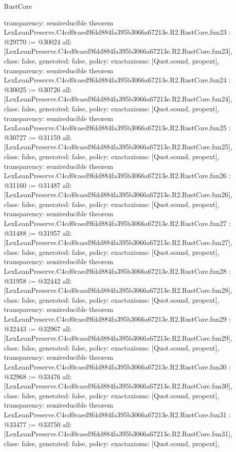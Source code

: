 \begin{lexlean}{RustCore}
\begin{coremodule}
{  transparency: semireducible
}
theorem LexLeanPreserve.C4cd0caed9fdd884fa395b3066a67213e.R2.RustCore.fun23 : @29770 := @30024 {
  all: [LexLeanPreserve.C4cd0caed9fdd884fa395b3066a67213e.R2.RustCore.fun23],
  class: false,
  generated: false,
  policy: exact{axioms: [Quot.sound, propext]},
  transparency: semireducible
}
theorem LexLeanPreserve.C4cd0caed9fdd884fa395b3066a67213e.R2.RustCore.fun24 : @30025 := @30726 {
  all: [LexLeanPreserve.C4cd0caed9fdd884fa395b3066a67213e.R2.RustCore.fun24],
  class: false,
  generated: false,
  policy: exact{axioms: [Quot.sound, propext]},
  transparency: semireducible
}
theorem LexLeanPreserve.C4cd0caed9fdd884fa395b3066a67213e.R2.RustCore.fun25 : @30727 := @31159 {
  all: [LexLeanPreserve.C4cd0caed9fdd884fa395b3066a67213e.R2.RustCore.fun25],
  class: false,
  generated: false,
  policy: exact{axioms: [Quot.sound, propext]},
  transparency: semireducible
}
theorem LexLeanPreserve.C4cd0caed9fdd884fa395b3066a67213e.R2.RustCore.fun26 : @31160 := @31487 {
  all: [LexLeanPreserve.C4cd0caed9fdd884fa395b3066a67213e.R2.RustCore.fun26],
  class: false,
  generated: false,
  policy: exact{axioms: [Quot.sound, propext]},
  transparency: semireducible
}
theorem LexLeanPreserve.C4cd0caed9fdd884fa395b3066a67213e.R2.RustCore.fun27 : @31488 := @31957 {
  all: [LexLeanPreserve.C4cd0caed9fdd884fa395b3066a67213e.R2.RustCore.fun27],
  class: false,
  generated: false,
  policy: exact{axioms: [Quot.sound, propext]},
  transparency: semireducible
}
theorem LexLeanPreserve.C4cd0caed9fdd884fa395b3066a67213e.R2.RustCore.fun28 : @31958 := @32442 {
  all: [LexLeanPreserve.C4cd0caed9fdd884fa395b3066a67213e.R2.RustCore.fun28],
  class: false,
  generated: false,
  policy: exact{axioms: [Quot.sound, propext]},
  transparency: semireducible
}
theorem LexLeanPreserve.C4cd0caed9fdd884fa395b3066a67213e.R2.RustCore.fun29 : @32443 := @32967 {
  all: [LexLeanPreserve.C4cd0caed9fdd884fa395b3066a67213e.R2.RustCore.fun29],
  class: false,
  generated: false,
  policy: exact{axioms: [Quot.sound, propext]},
  transparency: semireducible
}
theorem LexLeanPreserve.C4cd0caed9fdd884fa395b3066a67213e.R2.RustCore.fun30 : @32968 := @33476 {
  all: [LexLeanPreserve.C4cd0caed9fdd884fa395b3066a67213e.R2.RustCore.fun30],
  class: false,
  generated: false,
  policy: exact{axioms: [Quot.sound, propext]},
  transparency: semireducible
}
theorem LexLeanPreserve.C4cd0caed9fdd884fa395b3066a67213e.R2.RustCore.fun31 : @33477 := @33750 {
  all: [LexLeanPreserve.C4cd0caed9fdd884fa395b3066a67213e.R2.RustCore.fun31],
  class: false,
  generated: false,
  policy: exact{axioms: [Quot.sound, propext]},
}
\end{coremodule}
\end{lexlean}
